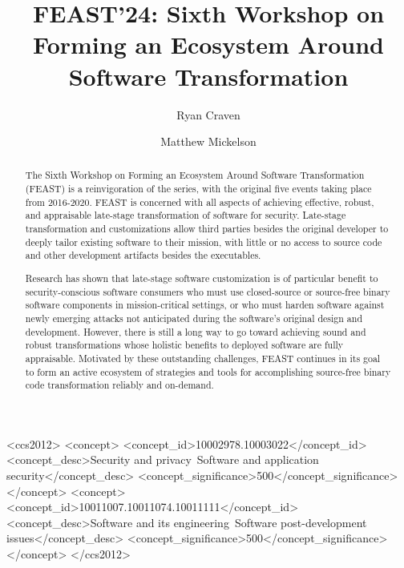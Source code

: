 \documentclass[sigconf]{acmart}
\begin{document}
\fancyhead{}

\title[FEAST'24]{FEAST'24: Sixth Workshop on Forming an Ecosystem Around Software Transformation}

\author{Ryan Craven}

\author{Matthew Mickelson}

\renewcommand{\shortauthors}{Ryan Craven and Matthew Mickelson}

\begin{abstract}
The Sixth Workshop on Forming an Ecosystem Around Software Transformation (FEAST)
is a reinvigoration of the series, with the original five events taking place from 2016-2020.
FEAST is concerned with all aspects of achieving effective, robust, and appraisable late-stage
transformation of software for security. Late-stage transformation and customizations allow
third parties besides the original developer to deeply tailor existing software to their mission,
with little or no access to source code and other development artifacts besides the executables.

Research has shown that late-stage software customization is of particular benefit to security-conscious
software consumers who must use closed-source or source-free binary software components in mission-critical settings,
or who must harden software against newly emerging attacks not anticipated during the software's original design and development.
However, there is still a long way to go toward achieving sound and robust transformations whose
holistic benefits to deployed software are fully appraisable.
Motivated by these outstanding challenges, FEAST continues in its goal to form an active ecosystem of strategies and tools
for accomplishing source-free binary code transformation reliably and on-demand.
\end{abstract}

\begin{CCSXML}
  <ccs2012>
  <concept>
  <concept_id>10002978.10003022</concept_id>
  <concept_desc>Security and privacy~Software and application security</concept_desc>
  <concept_significance>500</concept_significance>
  </concept>
  <concept>
  <concept_id>10011007.10011074.10011111</concept_id>
  <concept_desc>Software and its engineering~Software post-development issues</concept_desc>
  <concept_significance>500</concept_significance>
  </concept>
  </ccs2012>
\end{CCSXML}
  
\end{document}
